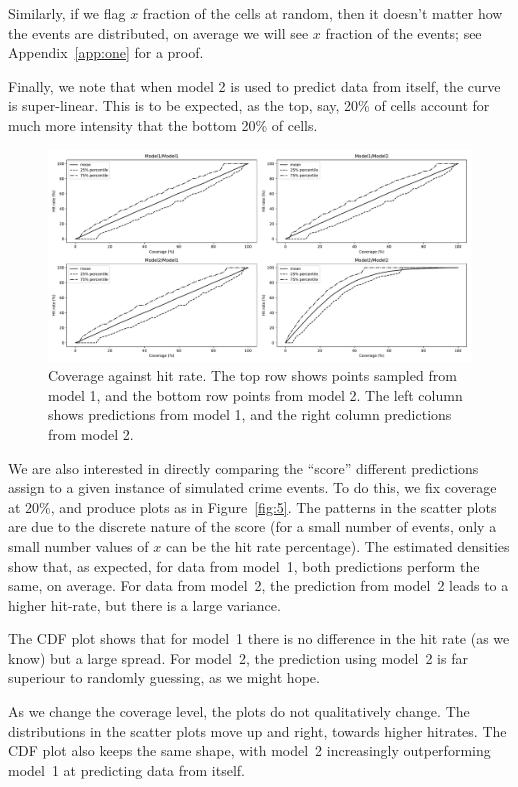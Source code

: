 \documentclass[twoside,a4paper,twocolumn,10pt]{article}
\theoremstyle{plain}
\theoremstyle{definition}
\begin{document}
Similarly, if we flag $x$ fraction of the cells at random, then it doesn't matter how the
events are distributed, on average we will see $x$ fraction of the events;
see Appendix~\ref{app:one} for a proof.

Finally, we note that when model 2 is used to predict data from itself, the curve is
super-linear.  This is to be expected, as the top, say, 20\% of cells account for much more
intensity that the bottom 20\% of cells.

\begin{figure}
  \includegraphics[width=\textwidth]{../details/hitrate1.pdf}
  \caption{Coverage against hit rate.  The top row shows points sampled from model 1,
and the bottom row points from model 2.  The left column shows predictions from model 1,
and the right column predictions from model 2.}
   \label{fig:4}
\end{figure}

We are also interested in directly comparing the ``score'' different predictions assign
to a given instance of simulated crime events.  To do this, we fix coverage at 20\%, and
produce plots as in Figure~\ref{fig:5}.  The patterns in the scatter plots are due to
the discrete nature of the score (for a small number of events, only a small number values
of $x$ can be the hit rate percentage).  The estimated densities show that, as expected,
for data from model~1, both predictions perform the same, on average.  For data from model~2,
the prediction from model~2 leads to a higher hit-rate, but there is a large variance.

The CDF plot shows that for model~1 there is
no difference in the hit rate (as we know) but a large spread.  For model~2, the prediction
using model~2 is far superiour to randomly guessing, as we might hope.

As we change the coverage level, the plots do not qualitatively change.  The distributions
in the scatter plots move up and right, towards higher hitrates.  The CDF plot also keeps
the same shape, with model~2 increasingly outperforming model~1 at predicting data from itself.
\end{document}
